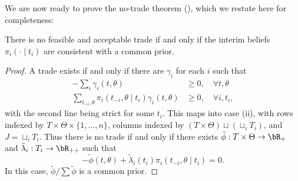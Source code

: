 We are now ready to prove the no-trade theorem (), which we restate here for completeness:
\begin{theorem}
  There is no feasible and acceptable trade if and only if the interim beliefs \(\pi_i(\cdot \mid t_i)\) are consistent with a common prior.
\end{theorem}
\begin{proof}
  A trade exists if and only if there are \(\gamma_i\) for each \(i\) such that
  \begin{align*}
    - \sum_i \gamma_i(t, \theta)
    &\geq 0, \quad \forall t, \theta \\
    \sum_{t_{-i}, \theta} \pi_i(t_{-i}, \theta \mid t_i) \gamma_i(t, \theta)
    &\geq 0, \quad \forall i, t_i,
  \end{align*}
  with the second line being strict for some \(t_i\).
  This maps into  case (ii), with rows indexed by \(T \times \Theta \times \{1, \dots, n\}\), columns indexed by \((T \times \Theta) \sqcup (\sqcup_i T_i)\), and \(J = \sqcup_i T_i\).
  Thus there is no trade if and only if there exists \(\tilde{\phi}: T \times \Theta \to \bR_+\) and \(\tilde{\lambda}_i : T_i \to \bR_{++}\) such that
  \[
    - \tilde{\phi}(t, \theta)
    + \tilde{\lambda}_i(t_i) \pi_i(t_{-i}, \theta \mid t_i)
    = 0.
  \]
  In this case, \(\tilde{\phi} / \sum \tilde{\phi}\) is a common prior.
\end{proof}

